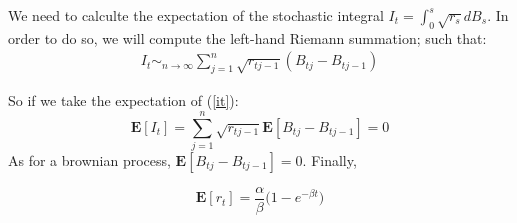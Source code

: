 \documentclass[12pt]{article}
\begin{document}
We need to calculte the expectation of the stochastic integral $I_t = \int_0^s \sqrt{r_s}dB_s$. In order to do so, we will compute the left-hand Riemann summation; such that:
\begin{align}\label{it}
I_t \sim_{n \rightarrow \infty} \sum_{j=1}^{n} \sqrt{r_{tj-1}}(B_{tj}-B_{tj-1})
\end{align}

So if we take the expectation of (\ref{it}): 
\begin{equation}
\mathbf{E}[I_t] = \sum_{j=1}^{n} \sqrt{r_{tj-1}}\mathbf{E}[B_{tj}-B_{tj-1}] = 0
\end{equation}
As for a brownian process, $\mathbf{E}[B_{tj}-B_{tj-1}] = 0$.  Finally, 

\begin{equation}
\mathbf{E}[r_t]  = \frac{\alpha}{\beta} \bigg(1-e^{-\beta t}\bigg)
\end{equation}
\end{document}
